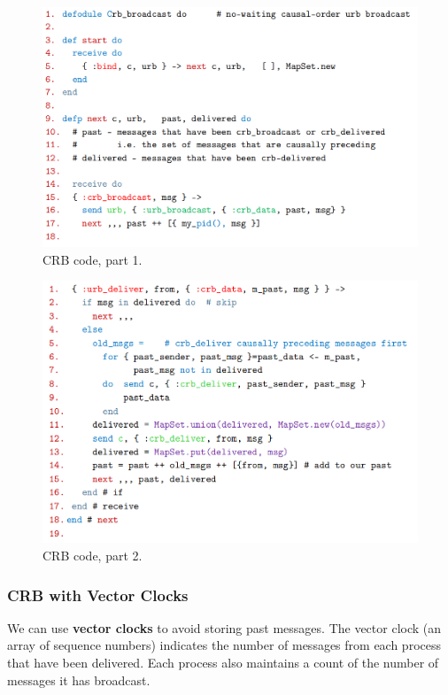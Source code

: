\documentclass[11pt]{article}
\begin{document}
\begin{figure}[htb!]
  \centering
  \caption{CRB code, part 1.}
  \includegraphics[scale=0.3]{crbcode1}
\end{figure}

\begin{figure}[htb!]
  \centering
  \caption{CRB code, part 2.}
  \includegraphics[scale=0.3]{crbcode2}
\end{figure}

\subsubsection{CRB with Vector Clocks}
We can use \textbf{vector clocks} to avoid storing past messages.
The vector clock (an array of sequence numbers) indicates the number of messages from each process that have been delivered.
Each process also maintains a count of the number of messages it has broadcast.
\end{document}
